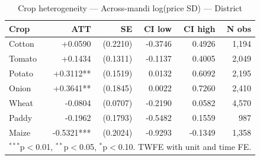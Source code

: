 \begin{table}[htbp]
\centering
\caption{Crop heterogeneity — Across-mandi log(price SD) — District}
\label{tab:spec2_across_district_crops}
\begin{tabular}{lrrrrr}
\hline\hline
Crop & ATT & SE & CI low & CI high & N obs \\
\hline
Cotton & +0.0590 & (0.2210) & -0.3746 & 0.4926 & 1,194 \\
Tomato & +0.1434 & (0.1311) & -0.1137 & 0.4005 & 2,049 \\
Potato & +0.3112** & (0.1519) & 0.0132 & 0.6092 & 2,195 \\
Onion & +0.3641** & (0.1845) & 0.0022 & 0.7260 & 2,410 \\
Wheat & -0.0804 & (0.0707) & -0.2190 & 0.0582 & 4,570 \\
Paddy & -0.1962 & (0.1793) & -0.5482 & 0.1559 & 987 \\
Maize & -0.5321*** & (0.2024) & -0.9293 & -0.1349 & 1,358 \\
\hline\hline
\multicolumn{6}{l}{\footnotesize $^{***}$p$<$0.01, $^{**}$p$<$0.05, $^{*}$p$<$0.10. TWFE with unit and time FE.} \\
\end{tabular}
\end{table}